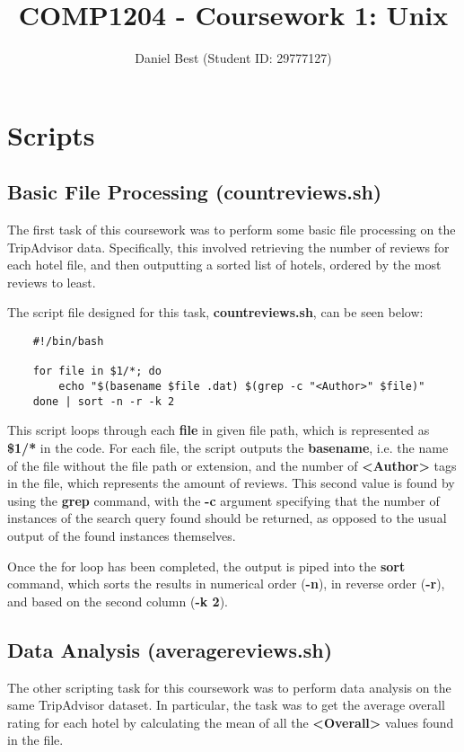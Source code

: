 \documentclass{article}
\title{COMP1204 - Coursework 1: Unix}
\author{Daniel Best (Student ID: 29777127)}
\begin{document}
	
	\maketitle
	
	\newpage
	\section{Scripts}
	
	\subsection{Basic File Processing (countreviews.sh)}
	The first task of this coursework was to perform some basic file processing on the TripAdvisor data. Specifically, this involved retrieving the number of reviews for each hotel file, and then outputting a sorted list of hotels, ordered by the most reviews to least. \newline
	
	\noindent
	The script file designed for this task, \textbf{countreviews.sh}, can be seen below:
	
	\begin{lstlisting}
	#!/bin/bash
	
	for file in $1/*; do	
		echo "$(basename $file .dat) $(grep -c "<Author>" $file)"
	done | sort -n -r -k 2
	\end{lstlisting}

	\noindent
	This script loops through each \textbf{file} in given file path, which is represented as \textbf{\$1/*} in the code. For each file, the script outputs the \textbf{basename}, i.e. the name of the file without the file path or extension, and the number of \textbf{{\textless}Author\textgreater} tags in the file, which represents the amount of reviews. This second value is found by using the \textbf{grep} command, with the \textbf{-c} argument specifying that the number of instances of the search query found should be returned, as opposed to the usual output of the found instances themselves. \newline
	
	\noindent
	Once the for loop has been completed, the output is piped into the \textbf{sort} command, which sorts the results in numerical order (\textbf{-n}), in reverse order (\textbf{-r}), and based on the second column (\textbf{-k 2}).
	
	\newpage
	\subsection{Data Analysis (averagereviews.sh)}
	The other scripting task for this coursework was to perform data analysis on the same TripAdvisor dataset. In particular, the task was to get the average overall rating for each hotel by calculating the mean of all the \textbf{{\textless}Overall\textgreater} values found in the file. \newline
	
\end{document}
